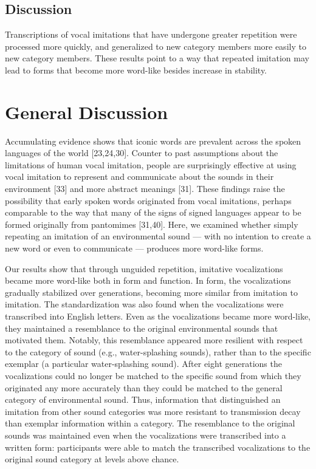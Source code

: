 \documentclass[english,floatsintext,man]{apa6}
\theoremstyle{definition}
\theoremstyle{definition}
\theoremstyle{definition}
\theoremstyle{remark}
\begin{document}
\hypertarget{discussion-2}{%
\subsection{Discussion}\label{discussion-2}}

Transcriptions of vocal imitations that have undergone greater
repetition were processed more quickly, and generalized to new category
members more easily to new category members. These results point to a
way that repeated imitation may lead to forms that become more word-like
besides increase in stability.

\hypertarget{general-discussion}{%
\section{General Discussion}\label{general-discussion}}

Accumulating evidence shows that iconic words are prevalent across the
spoken languages of the world {[}23,24,30{]}. Counter to past
assumptions about the limitations of human vocal imitation, people are
surprisingly effective at using vocal imitation to represent and
communicate about the sounds in their environment {[}33{]} and more
abstract meanings {[}31{]}. These findings raise the possibility that
early spoken words originated from vocal imitations, perhaps comparable
to the way that many of the signs of signed languages appear to be
formed originally from pantomimes {[}31,40{]}. Here, we examined whether
simply repeating an imitation of an environmental sound --- with no
intention to create a new word or even to communicate --- produces more
word-like forms.

Our results show that through unguided repetition, imitative
vocalizations became more word-like both in form and function. In form,
the vocalizations gradually stabilized over generations, becoming more
similar from imitation to imitation. The standardization was also found
when the vocalizations were transcribed into English letters. Even as
the vocalizations became more word-like, they maintained a resemblance
to the original environmental sounds that motivated them. Notably, this
resemblance appeared more resilient with respect to the category of
sound (e.g., water-splashing sounds), rather than to the specific
exemplar (a particular water-splashing sound). After eight generations
the vocalizations could no longer be matched to the specific sound from
which they originated any more accurately than they could be matched to
the general category of environmental sound. Thus, information that
distinguished an imitation from other sound categories was more
resistant to transmission decay than exemplar information within a
category. The resemblance to the original sounds was maintained even
when the vocalizations were transcribed into a written form:
participants were able to match the transcribed vocalizations to the
original sound category at levels above chance.
\end{document}
